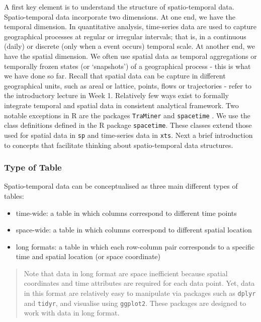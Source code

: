 \documentclass[
]{book}
\begin{document}
A first key element is to understand the structure of spatio-temporal data. Spatio-temporal data incorporate two dimensions. At one end, we have the temporal dimension. In quantitative analysis, time-series data are used to capture geographical processes at regular or irregular intervals; that is, in a continuous (daily) or discrete (only when a event occurs) temporal scale. At another end, we have the spatial dimension. We often use spatial data as temporal aggregations or temporally frozen states (or `snapshots') of a geographical process - this is what we have done so far. Recall that spatial data can be capture in different geographical units, such as areal or lattice, points, flows or trajectories - refer to the introductory lecture in Week 1. Relatively few ways exist to formally integrate temporal and spatial data in consistent analytical framework. Two notable exceptions in R are the packages \texttt{TraMiner} \citep{gabadinho2009mining} and \texttt{spacetime} \citep{pebesma2012spacetime}. We use the class definitions defined in the R package \texttt{spacetime}. These classes extend those used for spatial data in \texttt{sp} and time-series data in \texttt{xts}. Next a brief introduction to concepts that facilitate thinking about spatio-temporal data structures.

\hypertarget{type-of-table}{%
\subsubsection{Type of Table}\label{type-of-table}}

Spatio-temporal data can be conceptualised as three main different types of tables:

\begin{itemize}
\item
  time-wide: a table in which columns correspond to different time points
\item
  space-wide: a table in which columns correspond to different spatial location
\item
  long formats: a table in which each row-column pair corresponds to a specific time and spatial location (or space coordinate)
\end{itemize}

\begin{quote}
Note that data in long format are space inefficient because spatial coordinates and time attributes are required for each data point. Yet, data in this format are relatively easy to manipulate via packages such as \texttt{dplyr} and \texttt{tidyr}, and visualise using \texttt{ggplot2}. These packages are designed to work with data in long format.
\end{quote}
\end{document}
